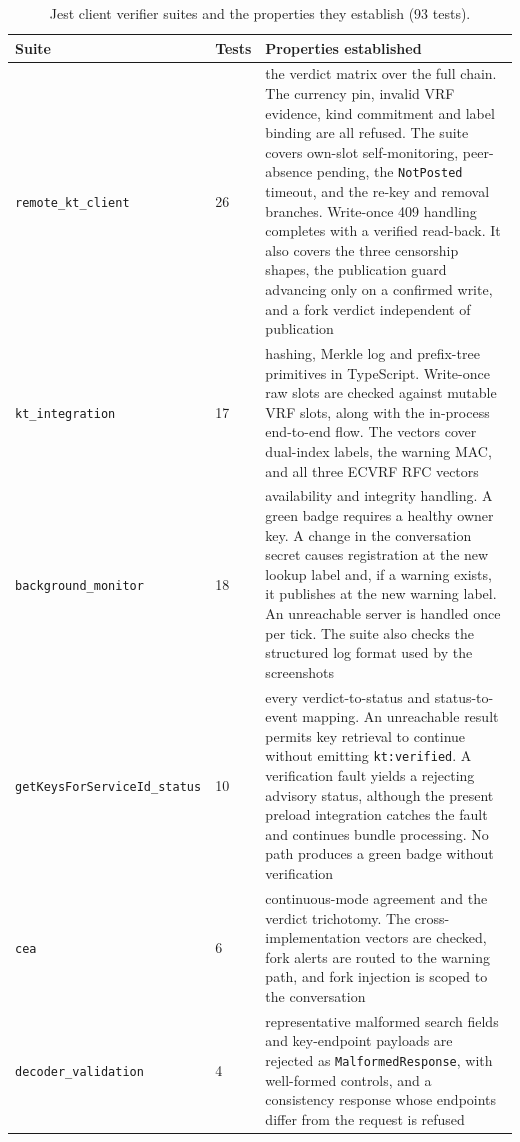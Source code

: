 \begin{table}[H]
\centering
\caption{Jest client verifier suites and the properties they establish (\num{93} tests).}
\label{tab:tests-jest-wire}
\footnotesize
\begin{tabular}{@{}ll>{\raggedright\arraybackslash}p{7.6cm}@{}}
\toprule
Suite & Tests & Properties established \\
\midrule
\texttt{remote\_kt\_client} & 26 & the verdict matrix over the full chain. The currency pin, invalid VRF evidence, kind commitment and label binding are all refused. The suite covers own-slot self-monitoring, peer-absence pending, the \texttt{NotPosted} timeout, and the re-key and removal branches. Write-once 409 handling completes with a verified read-back. It also covers the three censorship shapes, the publication guard advancing only on a confirmed write, and a fork verdict independent of publication \\
\texttt{kt\_integration} & 17 & hashing, Merkle log and prefix-tree primitives in TypeScript. Write-once raw slots are checked against mutable VRF slots, along with the in-process end-to-end flow. The vectors cover dual-index labels, the warning MAC, and all three ECVRF RFC vectors \\
\texttt{background\_monitor} & 18 & availability and integrity handling. A green badge requires a healthy owner key. A change in the conversation secret causes registration at the new lookup label and, if a warning exists, it publishes at the new warning label. An unreachable server is handled once per tick. The suite also checks the structured log format used by the screenshots \\
\texttt{getKeysForServiceId\_status} & 10 & every verdict-to-status and status-to-event mapping. An unreachable result permits key retrieval to continue without emitting \texttt{kt:verified}. A verification fault yields a rejecting advisory status, although the present preload integration catches the fault and continues bundle processing. No path produces a green badge without verification \\
\texttt{cea} & 6 & continuous-mode agreement and the verdict trichotomy. The cross-implementation vectors are checked, fork alerts are routed to the warning path, and fork injection is scoped to the conversation \\
\texttt{decoder\_validation} & 4 & representative malformed search fields and key-endpoint payloads are rejected as \texttt{MalformedResponse}, with well-formed controls, and a consistency response whose endpoints differ from the request is refused \\

\end{tabular}
\end{table}
